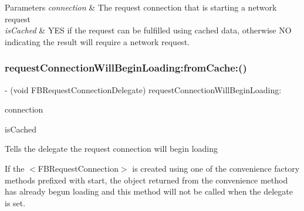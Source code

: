 \begin{DoxyParams}{Parameters}
{\em connection} & The request connection that is starting a network request \\
\hline
{\em is\+Cached} & Y\+ES if the request can be fulfilled using cached data, otherwise NO indicating the result will require a network request. \\
\hline
\end{DoxyParams}
\mbox{\label{protocolFBRequestConnectionDelegate_01-p_a8e31e2b5023edb3b869c0cd0be288a29}} 
\subsubsection{\texorpdfstring{request\+Connection\+Will\+Begin\+Loading\+:from\+Cache\+:()}{requestConnectionWillBeginLoading:fromCache:()}\hspace{0.1cm}{\footnotesize\ttfamily [3/5]}}
{\footnotesize\ttfamily -\/ (void F\+B\+Request\+Connection\+Delegate) request\+Connection\+Will\+Begin\+Loading\+: \begin{DoxyParamCaption}\item[{(\hyperlink{interfaceFBRequestConnection}{F\+B\+Request\+Connection} $\ast$)}]{connection }\item[{fromCache:(B\+O\+OL)}]{is\+Cached }\end{DoxyParamCaption}\hspace{0.3cm}{\ttfamily [optional]}}

Tells the delegate the request connection will begin loading

If the $<$\+F\+B\+Request\+Connection$>$ is created using one of the convenience factory methods prefixed with start, the object returned from the convenience method has already begun loading and this method will not be called when the delegate is set.


